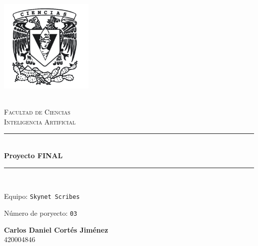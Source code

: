 \begin{titlepage}
    \center 
    \newcommand{\HRule}{\rule{\linewidth}{0.5mm}} 
    
    \includegraphics[width=4.5cm]{assets/imagenes/CienciasEscudo.png}
    
    \quad \\[0.2cm]
    \textsc{\huge Facultad de Ciencias}\\[.6cm] 
    \textsc{\huge Inteligencia Artificial}\\[0.5cm]
    
    \makeatletter
        \HRule \\ [0.4cm]
            { \huge \bfseries Proyecto FINAL}\\
        \HRule \\ [0.4cm]
        
    \vspace{2mm}
    
    \begin{flushleft}
        \Large{Equipo:} \texttt{\Large Skynet Scribes}
    \end{flushleft}
    \begin{flushleft}
        \Large{Número de poryecto:} \texttt{\Large 03}\\[0.8cm]
    \end{flushleft}
    
    
    \begin{minipage}{0.8\textwidth}
        \begin{flushright}
            \textbf{\large{Carlos Daniel Cortés Jiménez}}\\    
            420004846        
        \end{flushright}
    \end{minipage}
    

\end{titlepage}
